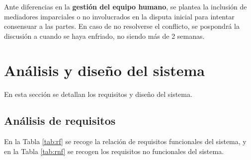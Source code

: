 \documentclass[11pt]{article}
\begin{document}
Ante diferencias en la \textbf{gestión del equipo humano}, se plantea la 
inclusión de
mediadores imparciales o no involucrados en la disputa inicial para intentar
consensuar a las partes. En caso de no resolverse el conflicto, se pospondrá
la discusión a cuando se haya enfriado, no siendo más de 2 semanas.


\newpage

\section{Análisis y diseño del sistema}
\label{sec:disennio}
En esta sección se detallan los requisitos y diseño del sistema.

\subsection{Análisis de requisitos}
En la Tabla \ref{tab:rf} se recoge la relación de requisitos funcionales del
sistema, y en la Tabla \ref{tab:rnf} se recogen los requisitos no
funcionales del sistema.
\end{document}
